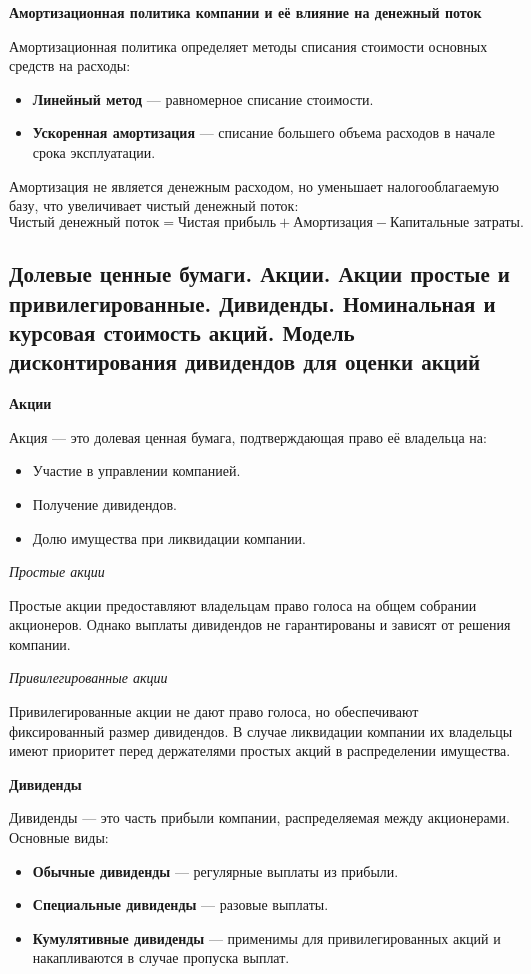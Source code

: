 \textbf{Амортизационная политика компании и её влияние на денежный поток}

Амортизационная политика определяет методы списания стоимости основных средств на расходы:
\begin{itemize}
    \item \textbf{Линейный метод} --- равномерное списание стоимости.
    \item \textbf{Ускоренная амортизация} --- списание большего объема расходов в начале срока эксплуатации.
\end{itemize}
Амортизация не является денежным расходом, но уменьшает налогооблагаемую базу, что увеличивает чистый денежный поток:
\begin{equation}
    \text{Чистый денежный поток} = \text{Чистая прибыль} + \text{Амортизация} - \text{Капитальные затраты}.
\end{equation}

\pagebreak
\subsection{Долевые ценные бумаги. Акции. Акции простые и привилегированные. Дивиденды. Номинальная и курсовая стоимость акций. Модель дисконтирования дивидендов для оценки акций}

\textbf{Акции}

Акция --- это долевая ценная бумага, подтверждающая право её владельца на:
\begin{itemize}
    \item Участие в управлении компанией.
    \item Получение дивидендов.
    \item Долю имущества при ликвидации компании.
\end{itemize}

\textit{Простые акции}

Простые акции предоставляют владельцам право голоса на общем собрании акционеров. Однако выплаты дивидендов не гарантированы и зависят от решения компании.

\textit{Привилегированные акции}

Привилегированные акции не дают право голоса, но обеспечивают фиксированный размер дивидендов. В случае ликвидации компании их владельцы имеют приоритет перед держателями простых акций в распределении имущества.

\textbf{Дивиденды}

Дивиденды --- это часть прибыли компании, распределяемая между акционерами. Основные виды:
\begin{itemize}
    \item \textbf{Обычные дивиденды} --- регулярные выплаты из прибыли.
    \item \textbf{Специальные дивиденды} --- разовые выплаты.
    \item \textbf{Кумулятивные дивиденды} --- применимы для привилегированных акций и накапливаются в случае пропуска выплат.
\end{itemize}

